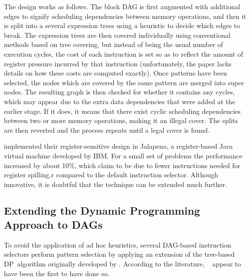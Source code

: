 The design works as follows.
%
The \gls{block DAG} is first augmented with additional \glspl{edge} to signify
scheduling dependencies between memory operations, and then it is split into a
several \glspl{expression tree} using a heuristic to decide which \glspl{edge}
to break.
%
The \glspl{expression tree} are then covered individually using conventional
methods based on \gls{tree covering}, but instead of being the usual number of
execution cycles, the cost of each \gls{instruction} is set so as to reflect the
amount of \gls{register pressure} incurred by that instruction (unfortunately,
the paper lacks details on how these costs are computed exactly).
%
Once \glspl{pattern} have been selected, the \glspl{node} which are covered by
the same \gls{pattern} are merged into \glspl{super node}.
%
The resulting \gls{graph} is then checked for whether it contains any
\glspl{cycle}, which may appear due to the extra data dependencies that were
added at the earlier stage.
%
If it does, it means that there exist cyclic scheduling dependencies between two
or more memory operations, making it an illegal cover.
%
The splits are then reverted and the process repeats until a legal cover is
found.

\citeauthor{SarkarEtAl:2001} implemented their \gls{register}-sensitive design
in \gls{Jalapeno}, a \gls{register}-based \gls{Java} virtual machine developed
by \gls{IBM}.
%
For a small set of problems the performance increased by about 10\%, which
\citeauthor{SarkarEtAl:2001} claim to be due to fewer \glspl{instruction} needed
for \gls{register} \gls{spilling.r} compared to the default \gls{instruction
  selector}.
%
Although innovative, it is doubtful that the technique can be extended much
further.


\subsection{Extending the Dynamic Programming Approach to DAGs}

To avoid the application of ad hoc heuristics, several \gls{DAG}-based
\glspl{instruction selector} perform \gls{pattern selection} by applying an
extension of the \gls{tree}-based \gls{DP}~algorithm originally developed by
\textcite{AhoJohnson:1976}.
%
According to the literature, \citeauthor{LiemEtAl:1994}~\cite{LiemEtAl:1994,
  PaulinEtAl:1994, PaulinEtAl:1995} appear to have been the first to have done
so.

